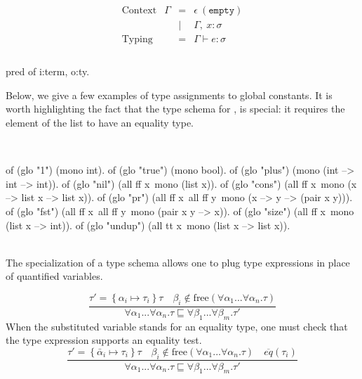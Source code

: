 \documentclass[a4paper, 11pt]{book}
\newenvironment{elpicode}
  {\VerbatimEnvironment~\\\begin{elpibox}\begin{xelpicode}}{\end{xelpicode}
\end{elpibox}\\}
\begin{document}
\begin{center}
\begin{minipage}{0.5\textwidth}
$$
\begin{array}{llrl}
  \\
    \text{Context}     & \Gamma & = & \epsilon\ \mathtt{(empty)}\\
                       &        & \vert& \Gamma,\ x : \sigma\\
    \text{Typing}      &        & = & \Gamma \vdash e : \sigma\\
  \\
  \end{array}
$$
\end{minipage}
\begin{minipage}{0.4\textwidth}
\begin{elpicodelj}
pred of i:term, o:ty.
\end{elpicodelj}
\end{minipage}
\end{center}


Below, we give a few examples of type assignments to global constants. It is
worth highlighting the fact that the type schema for , is
special: it requires the element of the list to have an equality type.

\begin{elpicode}
of (glo "1")      (mono int).
of (glo "true")   (mono bool).
of (glo "plus")   (mono (int --> int --> int)).
of (glo "nil")    (all ff x\ mono (list x)).
of (glo "cons")   (all ff x\ mono (x --> list x --> list x)).
of (glo "pr")     (all ff x\ all ff y\ mono (x --> y --> (pair x y))).
of (glo "fst")    (all ff x\ all ff y\ mono (pair x y --> x)).
of (glo "size")   (all ff x\ mono (list x --> int)).
of (glo "undup")  (all tt x\ mono (list x --> list x)).
\end{elpicode}
\noindent
The specialization of a type schema allows one to plug type expressions in
place of quantified variables.

$$
\displaystyle\frac{\tau' = \left\{\alpha_i \mapsto \tau_i\right\} \tau \quad \beta_i \not\in \textrm{free}(\forall \alpha_1...\forall\alpha_n . \tau)}{\forall \alpha_1...\forall\alpha_n . \tau \sqsubseteq \forall \beta_1...\forall\beta_m . \tau'}
$$
 When the substituted variable stands for an
equality type, one must check that the type expression supports an equality
test.
$$
\displaystyle\frac{\tau' = \left\{\bar\alpha_i \mapsto \tau_i\right\} \tau \quad \beta_i \not\in \textrm{free}(\forall \alpha_1...\forall\alpha_n . \tau) \quad \overline{eq}(\tau_i)}{\forall \alpha_1...\forall\alpha_n . \tau \sqsubseteq \forall \beta_1...\forall\beta_m . \tau'}
$$
\end{document}
